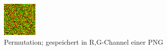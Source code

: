 \begin{figure}[H]
\begin{minipage}[t]{0.45\linewidth}
        \includegraphics[interpolate=false,width=\linewidth]{content/simulatedAnnealing/Bilder/permutation_texture_295744_swapsKirkpatrickCooldownSchedule.png}
        \caption{Permutation; gespeichert in R,G-Channel einer PNG}
        \label{pic:Retargeting textur}
    \end{minipage}
\end{figure}


